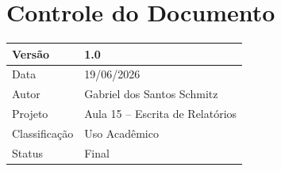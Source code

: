 \documentclass{article}
\begin{document}
\newpage
\section*{Controle do Documento}

\begin{table}[H]
\centering
\begin{tabular}{|l|l|}
\hline
Versão & 1.0 \\ \hline
Data & 19/06/2026 \\ \hline
Autor & Gabriel dos Santos Schmitz \\ \hline
Projeto & Aula 15 -- Escrita de Relatórios \\ \hline
Classificação & Uso Acadêmico \\ \hline
Status & Final \\ \hline
\end{tabular}
\end{table}
\tableofcontents
\listoffigures

\newpage






\newpage
\printbibliography[title=Referências]
\end{document}
